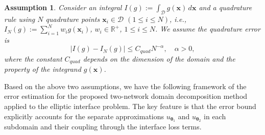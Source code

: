 \documentclass{article}
\newtheorem{assumption}{Assumption}[section]
\begin{document}
\begin{assumption}\label{e2}
Consider an integral $I(g) := \int_{\mathcal{D}} g(\boldsymbol{x}) \, d\boldsymbol{x}$ and a quadrature rule using $N$ quadrature points $\boldsymbol{x}_i \in \mathcal{D}$ $(1 \leq i \leq N)$, i.e., $I_N(g) := \sum_{i=1}^{N} w_i g(\boldsymbol{x}_i)$, $w_i \in \mathbb{R}^+$, $1 \leq i \leq N$. We assume the quadrature error is
\begin{equation}
|I(g) - I_N(g)| \leq C_{quad} N^{-\alpha}, \quad \alpha > 0,
\end{equation}
where the constant $C_{quad}$ depends on the dimension of the domain and the property of the integrand $g(\boldsymbol{x})$.
\end{assumption}

Based on the above two assumptions, we have the following framework of the error estimation for the proposed two-network domain decomposition method applied to the elliptic interface problem. The key feature is that the error bound explicitly accounts for the separate approximations $u_{\boldsymbol{\theta}_1}$ and $u_{\boldsymbol{\theta}_2}$ in each subdomain and their coupling through the interface loss terms.
\end{document}
